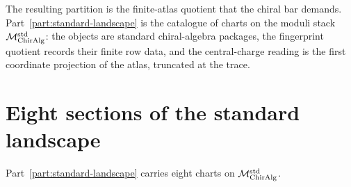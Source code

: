The resulting partition is the finite-atlas quotient that the chiral
bar demands. Part~\ref{part:standard-landscape} is the catalogue of
charts on the moduli stack
$\mathcal{M}_{\mathrm{ChirAlg}}^{\mathrm{std}}$: the objects are standard
chiral-algebra packages, the fingerprint quotient records their
finite row data, and the central-charge reading is the first
coordinate projection of the atlas, truncated at the trace.

\section{Eight sections of the standard landscape}
\label{sec:part-iii-eight-sections}

Part~\ref{part:standard-landscape} carries eight charts on
$\mathcal{M}_{\mathrm{ChirAlg}}^{\mathrm{std}}$.

